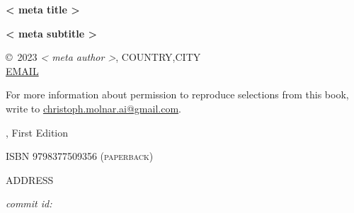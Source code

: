 \thispagestyle{empty}

\newcommand{\authorMail}{EMAIL}
\newcommand{\authorCity}{CITY}
\newcommand{\authorCountry}{COUNTRY}
\newcommand{\authorAddress}{ADDRESS}
\newcommand{\isbn}{ISBN}
\newcommand{\edition}{First Edition}


\thispagestyle{empty}
\begin{center}
  {
  \bfseries \sffamily \LARGE {{< meta title >}}\par
  \bfseries \small {{< meta subtitle >}}\par
}

  \copyright~2023 \textit{{{< meta author >}}}, \authorCountry,\authorCity \\
\url{\authorMail}

For more information about permission to reproduce selections from this book, write to \url{christoph.molnar.ai@gmail.com}.

	\the\year, \edition

\textsc{ISBN 9798377509356 (paperback)} 

\authorAddress

\vspace*{1cm}

\textit{commit id: }

\end{center}

\newpage
\thispagestyle{empty}
\mbox{}
\newpage

